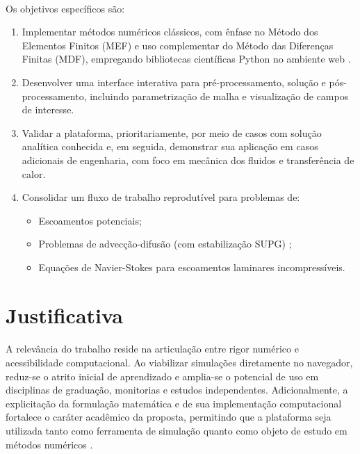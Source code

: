 \paragraph{}Os objetivos específicos são:
\begin{enumerate}
    \item Implementar métodos numéricos clássicos, com ênfase no Método dos Elementos Finitos (MEF) e uso complementar do Método das Diferenças Finitas (MDF), empregando bibliotecas científicas Python no ambiente web \cite{Harris2020}.
    \item Desenvolver uma interface interativa para pré-processamento, solução e pós-processamento, incluindo parametrização de malha e visualização de campos de interesse.
    \item Validar a plataforma, prioritariamente, por meio de casos com solução analítica conhecida e, em seguida, demonstrar sua aplicação em casos adicionais de engenharia, com foco em mecânica dos fluidos e transferência de calor.
    \item Consolidar um fluxo de trabalho reprodutível para problemas de:
    \begin{itemize}
        \item Escoamentos potenciais;
        \item Problemas de advecção-difusão (com estabilização SUPG) \cite{Brooks1982};
        \item Equações de Navier-Stokes para escoamentos laminares incompressíveis.
    \end{itemize}
\end{enumerate}

\section{Justificativa}

\paragraph{}A relevância do trabalho reside na articulação entre rigor numérico e acessibilidade computacional. Ao viabilizar simulações diretamente no navegador, reduz-se o atrito inicial de aprendizado e amplia-se o potencial de uso em disciplinas de graduação, monitorias e estudos independentes. Adicionalmente, a explicitação da formulação matemática e de sua implementação computacional fortalece o caráter acadêmico da proposta, permitindo que a plataforma seja utilizada tanto como ferramenta de simulação quanto como objeto de estudo em métodos numéricos \cite{Fish2007}.

